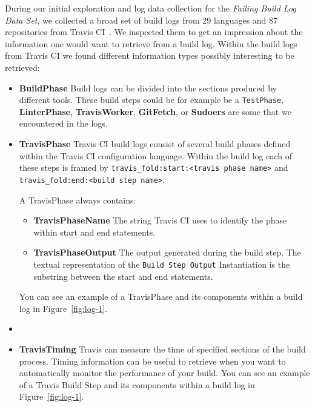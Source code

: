 \documentclass[\myrootdir/main.tex]{subfiles}
\begin{document}
During our initial exploration and log data collection for the \emph{Failing Build Log Data Set}, we collected a broad set of build logs from 29 languages and 87 repositories from Travis CI~\cite{travisci2019webpage}.
We inspected them to get an impression about the information one would want to retrieve from a build log.
Within the build logs from Travis CI we found different information types possibly interesting to be retrieved:

\begin{itemize}
	\item \textbf{BuildPhase} Build logs can be divided into the sections produced by different tools.
	      These build steps could be for example be a \texttt{TestPhase}, \textbf{LinterPhase}, \textbf{TravisWorker}, \textbf{GitFetch}, or \textbf{Sudoers} are some that we encountered in the logs.

	\item \textbf{TravisPhase} Travis CI build logs consist of several build phases defined within the Travis CI configuration language. Within the build log each of these steps is framed by \lstinline{travis_fold:start:<travis phase name>} and \\ \lstinline{travis_fold:end:<build step name>}.

	      A TravisPhase always contains:
	      \begin{itemize}
		      \item \textbf{TravisPhaseName} The string Travis CI uses to identify the phase within start and end statements.
		      \item \textbf{TravisPhaseOutput} The output generated during the build step. The textual representation of the \texttt{Build Step Output} Instantiation is the substring between the start and end statements.
	      \end{itemize}
	      You can see an example of a TravisPhase and its components within a build log in Figure~\ref{fig:log-1}.

	\item
	\item \textbf{TravisTiming} Travis can measure the time of specified sections of the build process.
	      Timing information can be useful to retrieve when you want to automatically monitor the performance of your build.
	      You can see an example of a Travis Build Step and its components within a build log in Figure~\ref{fig:log-1}.


\end{itemize}
\end{document}
